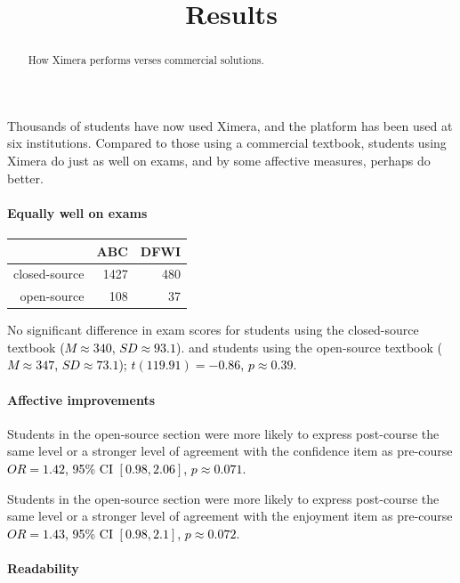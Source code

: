 \documentclass{ximera}
\title{Results}
\begin{document}
\begin{abstract}
  How Ximera performs verses commercial solutions.
\end{abstract}
\maketitle

Thousands of students have now used Ximera, and the platform has been
used at six institutions.  Compared to those using a commercial
textbook, students using Ximera do just as well on exams, and by some
affective measures, perhaps do better.


\paragraph{Equally well on exams}

\begin{center}
  \begin{tabular}{rrr}
    \hline
    & ABC & DFWI \\ 
    \hline
    closed-source & 1427 & 480 \\ 
    open-source & 108 &  37 \\ 
    \hline
  \end{tabular}
\end{center}
    
No significant difference in exam scores for students using the
closed-source textbook \textcolor{black}{(\(M \approx 340\),
  \(SD \approx 93.1\))}.  and students using the open-source textbook
\textcolor{black}{(\(M \approx 347\), \(SD \approx 73.1\));}
\textcolor{black}{\(t( 119.91 ) = -0.86\), \(p\approx 0.39\).}

\paragraph{Affective improvements}

Students in the open-source section were more likely to express
post-course the same level or a stronger level of agreement with the
confidence item as pre-course \textcolor{black}{\(OR = 1.42\), 95\% CI
  \([ 0.98 , 2.06 ]\), \(p\approx 0.071\).}

Students in the open-source section were more likely to express
post-course the same level or a stronger level of agreement with the
enjoyment item as pre-course \textcolor{black}{\(OR = 1.43\), 95\% CI
  \([ 0.98 , 2.1 ]\), \(p\approx 0.072\).}

\paragraph{Readability}
\end{document}
